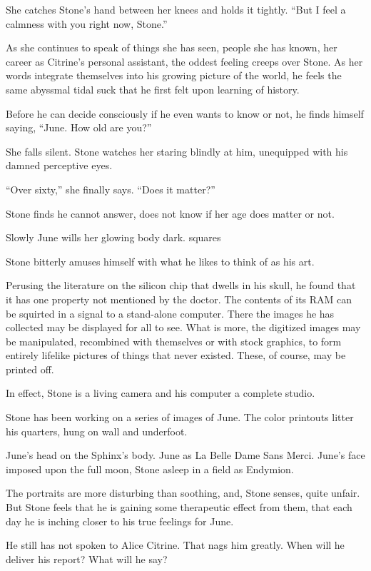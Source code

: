 She catches Stone’s hand between her knees and holds it tightly. “But I feel a calmness with you right now, Stone.”

As she continues to speak of things she has seen, people she has known, her career as Citrine’s personal assistant, the oddest feeling creeps over Stone. As her words integrate themselves into his growing picture of the world, he feels the same abyssmal tidal suck that he first felt upon learning of history.

Before he can decide consciously if he even wants to know or not, he finds himself saying, “June. How old are you?”

She falls silent. Stone watches her staring blindly at him, unequipped with his damned perceptive eyes.

“Over sixty,” she finally says. “Does it matter?”

Stone finds he cannot answer, does not know if her age does matter or not.

Slowly June wills her glowing body dark.
squares

Stone bitterly amuses himself with what he likes to think of as his art.

Perusing the literature on the silicon chip that dwells in his skull, he found that it has one property not mentioned by the doctor. The contents of its RAM can be squirted in a signal to a stand-alone computer. There the images he has collected may be displayed for all to see. What is more, the digitized images may be manipulated, recombined with themselves or with stock graphics, to form entirely lifelike pictures of things that never existed. These, of course, may be printed off.

In effect, Stone is a living camera and his computer a complete studio.

Stone has been working on a series of images of June. The color printouts litter his quarters, hung on wall and underfoot.

June’s head on the Sphinx’s body. June as La Belle Dame Sans Merci. June’s face imposed upon the full moon, Stone asleep in a field as Endymion.

The portraits are more disturbing than soothing, and, Stone senses, quite unfair. But Stone feels that he is gaining some therapeutic effect from them, that each day he is inching closer to his true feelings for June.

He still has not spoken to Alice Citrine. That nags him greatly. When will he deliver his report? What will he say?

